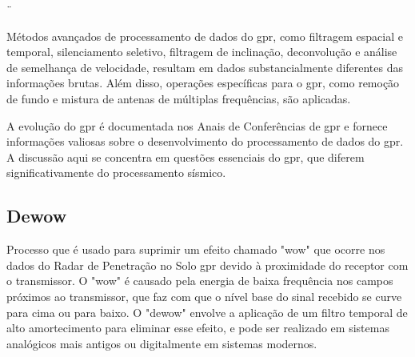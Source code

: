 




 ¨%




Métodos avançados de processamento de dados do \ac*{gpr}, como filtragem espacial e temporal, silenciamento seletivo, filtragem de inclinação, deconvolução e análise de semelhança de velocidade, resultam em dados substancialmente diferentes das informações brutas. Além disso, operações específicas para o \ac*{gpr}, como remoção de fundo e mistura de antenas de múltiplas frequências, são aplicadas.

A evolução do \ac*{gpr} é documentada nos Anais de Conferências de \ac*{gpr} e fornece informações valiosas sobre o desenvolvimento do processamento de dados do \ac*{gpr}. A discussão aqui se concentra em questões essenciais do \ac*{gpr}, que diferem significativamente do processamento sísmico.

\subsection{Dewow}
\label{subsubsec:dewow}

Processo que é usado para suprimir um efeito chamado "wow" que ocorre nos dados do Radar de Penetração no Solo \ac{gpr} devido à proximidade do receptor com o transmissor. O "wow" é causado pela energia de baixa frequência nos campos próximos ao transmissor, que faz com que o nível base do sinal recebido se curve para cima ou para baixo. O "dewow" envolve a aplicação de um filtro temporal de alto amortecimento para eliminar esse efeito, e pode ser realizado em sistemas analógicos mais antigos ou digitalmente em sistemas modernos.

